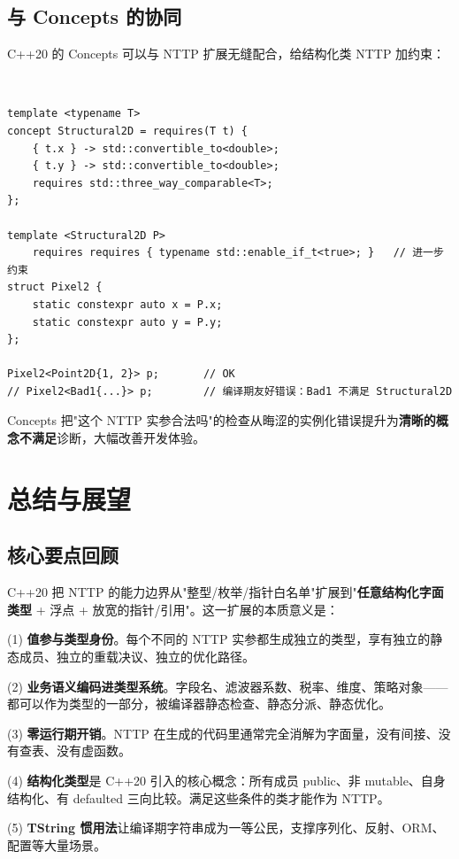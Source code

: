 \documentclass[12pt,a4paper,fontset=fandol]{ctexbook}
\newcommand{\cppxxlabel}[1]{%
  \tcbox[on line,colback=cpp20bg,colframe=cpp20bg,
    boxrule=0pt,arc=1pt,left=2pt,right=2pt,top=1pt,bottom=1pt,
    colupper=white,fontupper=\scriptsize\bfseries]{#1}}
\newcommand{\cpp}[1]{C++#1}
\begin{document}
\section{与 Concepts 的协同}

\cpp{20} 的 Concepts 可以与 NTTP 扩展无缝配合，给结构化类 NTTP 加约束：

\cppxxlabel{C++20}\ \begin{lstlisting}
template <typename T>
concept Structural2D = requires(T t) {
    { t.x } -> std::convertible_to<double>;
    { t.y } -> std::convertible_to<double>;
    requires std::three_way_comparable<T>;
};

template <Structural2D P>
    requires requires { typename std::enable_if_t<true>; }   // 进一步约束
struct Pixel2 {
    static constexpr auto x = P.x;
    static constexpr auto y = P.y;
};

Pixel2<Point2D{1, 2}> p;       // OK
// Pixel2<Bad1{...}> p;        // 编译期友好错误：Bad1 不满足 Structural2D
\end{lstlisting}

Concepts 把"这个 NTTP 实参合法吗"的检查从晦涩的实例化错误提升为\textbf{清晰的概念不满足}诊断，大幅改善开发体验。

\chapter{总结与展望}

\section{核心要点回顾}

\begin{guideline}
\cpp{20} 把 NTTP 的能力边界从"整型/枚举/指针白名单"扩展到"\textbf{任意结构化字面类型} + 浮点 + 放宽的指针/引用"。这一扩展的本质意义是：

(1) \textbf{值参与类型身份}。每个不同的 NTTP 实参都生成独立的类型，享有独立的静态成员、独立的重载决议、独立的优化路径。

(2) \textbf{业务语义编码进类型系统}。字段名、滤波器系数、税率、维度、策略对象——都可以作为类型的一部分，被编译器静态检查、静态分派、静态优化。

(3) \textbf{零运行期开销}。NTTP 在生成的代码里通常完全消解为字面量，没有间接、没有查表、没有虚函数。

(4) \textbf{结构化类型}是 \cpp{20} 引入的核心概念：所有成员 public、非 mutable、自身结构化、有 defaulted 三向比较。满足这些条件的类才能作为 NTTP。

(5) \textbf{TString 惯用法}让编译期字符串成为一等公民，支撑序列化、反射、ORM、配置等大量场景。
\end{guideline}
\end{document}
